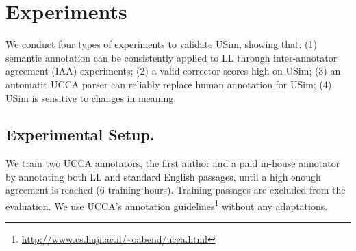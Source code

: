 \documentclass[a4paper, 11pt]{article}
\begin{document}
%
%
%

\section{Experiments}


We conduct four types of experiments to validate {\sc USim}, showing that:
(1) semantic annotation can be consistently applied to LL through inter-annotator agreement (IAA) experiments;
(2) a valid corrector scores high on {\sc USim};
(3) an automatic UCCA parser can reliably replace human annotation for {\sc USim};
(4) {\sc USim} is sensitive to changes in meaning.

\subsection{Experimental Setup.}
We train two UCCA annotators, the first author and a paid in-house annotator by annotating both LL and standard English
passages, until a high enough agreement is reached (6 training hours).
Training passages are excluded from the evaluation.
We use UCCA's annotation
guidelines\footnote{\url{http://www.cs.huji.ac.il/~oabend/ucca.html}}
without any adaptations.
\end{document}
